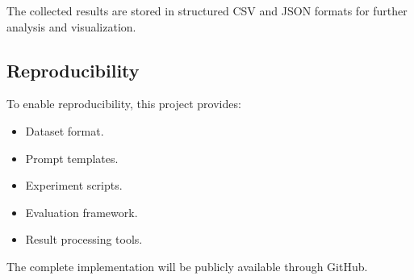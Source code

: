 The collected results are stored in structured CSV and JSON formats for further
analysis and visualization.



\subsection{Reproducibility}


To enable reproducibility, this project provides:


\begin{itemize}

\item Dataset format.

\item Prompt templates.

\item Experiment scripts.

\item Evaluation framework.

\item Result processing tools.

\end{itemize}


The complete implementation will be publicly available through GitHub.
